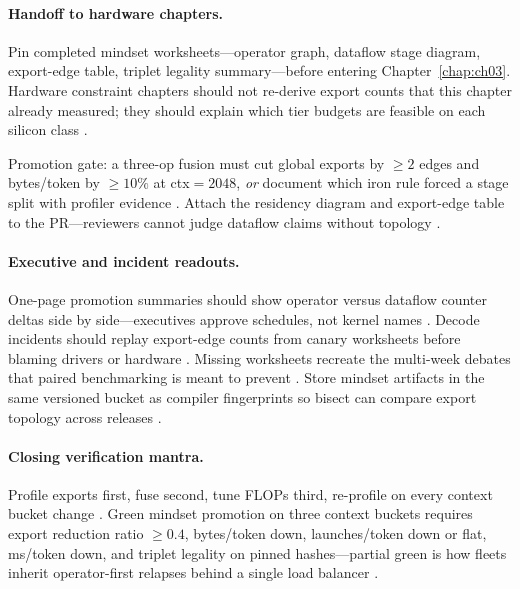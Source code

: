 \paragraph{Handoff to hardware chapters.}
Pin completed mindset worksheets---operator graph, dataflow stage diagram, export-edge table, triplet legality summary---before entering Chapter~\ref{chap:ch03}.
Hardware constraint chapters should not re-derive export counts that this chapter already measured; they should explain which tier budgets are feasible on each silicon class \citep{nvidia2022hopper,amd2024xdna}.

\begin{example}
Promotion gate: a three-op fusion must cut global exports by ${\ge}2$ edges and bytes/token by ${\ge}10\%$ at ctx${=}2048$, \emph{or} document which iron rule forced a stage split with profiler evidence \citep{memoryfloor2026,yirage2026}.
Attach the residency diagram and export-edge table to the PR---reviewers cannot judge dataflow claims without topology \citep{taxbreak2026}.
\end{example}

\paragraph{Executive and incident readouts.}
One-page promotion summaries should show operator versus dataflow counter deltas side by side---executives approve schedules, not kernel names \citep{patel2025llminference,memoryfloor2026}.
Decode incidents should replay export-edge counts from canary worksheets before blaming drivers or hardware \citep{taxbreak2026}.
Missing worksheets recreate the multi-week debates that paired benchmarking is meant to prevent \citep{yirage2026}.
Store mindset artifacts in the same versioned bucket as compiler fingerprints so bisect can compare export topology across releases \citep{chen2020compilerbasedhardw}.

\paragraph{Closing verification mantra.}
Profile exports first, fuse second, tune FLOPs third, re-profile on every context bucket change \citep{taxbreak2026,memoryfloor2026,patel2025llminference}.
Green mindset promotion on three context buckets requires export reduction ratio ${\ge}0.4$, bytes/token down, launches/token down or flat, ms/token down, and triplet legality on pinned hashes---partial green is how fleets inherit operator-first relapses behind a single load balancer \citep{yirage2026,kwon2023vllm}.

